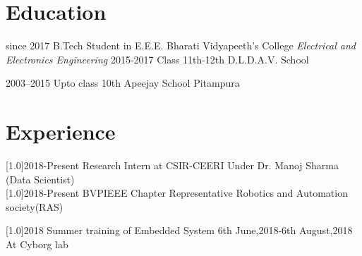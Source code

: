 \documentclass[espanol]{cv-style}     %
\begin{document}
\section{Education}

\begin{entrylist}
  \entry
    {since 2017}
    {B.Tech Student in E.E.E.}
    {Bharati Vidyapeeth's College}
    {\emph{Electrical and Electronics Engineering}}
  \entry
    {2015-2017}
    {Class 11th-12th}
    {D.L.D.A.V. School}
    
  \entry
    {2003–2015}
    {Upto class 10th}
    {Apeejay School Pitampura}
  
\end{entrylist}
\section{Experience}
  \vspace{-0.2cm}
\begin{entrylist}
\entry
{\scalebox{.8}[1.0]{2018-Present}}
{Research Intern at CSIR-CEERI}
{}
{{Under Dr. Manoj Sharma (Data Scientist)}}\\
\entry
{\scalebox{.8}[1.0]{2018-Present}}
{BVPIEEE Chapter Representative}
{   }
{Robotics and Automation society(RAS)}

\entry
{\scalebox{.8}[1.0]{2018}}
{Summer training of Embedded System}
{6th June,2018-6th August,2018}
{At Cyborg lab}
\end{entrylist}
\end{document}
